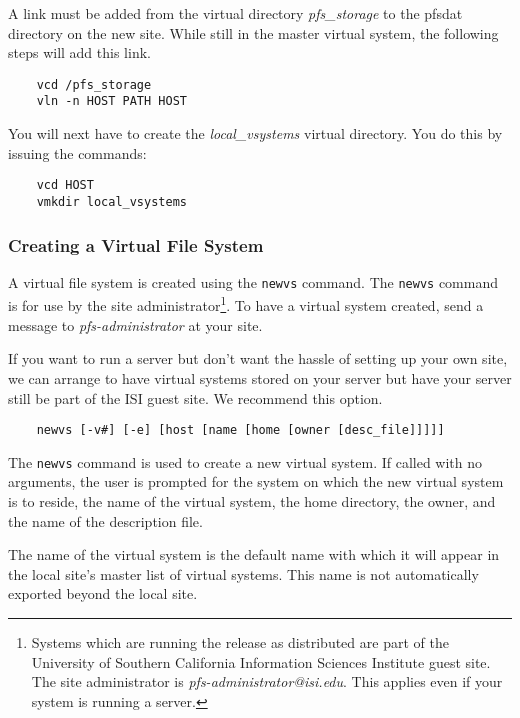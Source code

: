 A link must be added from the virtual directory {\it pfs\_storage} to
the pfsdat directory on the new site.  While still in the master
virtual system, the following steps will add this link.

\begin{verbatim}
    vcd /pfs_storage
    vln -n HOST PATH HOST
\end{verbatim}

You will next have to create the {\it local\_vsystems} virtual
directory.  You do this by issuing the commands:

\begin{verbatim}
    vcd HOST
    vmkdir local_vsystems
\end{verbatim}

\subsubsection{Creating a Virtual File System\label{creating_vfs}}

A virtual file system is created using the {\tt newvs} command.  The
{\tt newvs} command is for use by the site
administrator\footnote{Systems which are running the release as
distributed are part of the University of Southern California
Information Sciences Institute guest site.  The site 
administrator is {\it pfs-administrator@isi.edu}.  This
applies even if your system is running a server.}.  To have a virtual
system created, send a message to {\it pfs-administrator} at your
site.

If you want to run a server but don't want the hassle of setting up
your own site, we can arrange to have virtual systems stored on your
server but have your server still be part of the ISI guest site.  We
recommend this option.

\begin{verbatim}
    newvs [-v#] [-e] [host [name [home [owner [desc_file]]]]]
\end{verbatim}

The {\tt newvs} command is used to create a new virtual system.  If
called with no arguments, the user is prompted for the system on which
the new virtual system is to reside, the name of the virtual system,
the home directory, the owner, and the name of the description file.

The name of the virtual system is the default name with which it will
appear in the local site's master list of virtual systems.  This name
is not automatically exported beyond the local site.

